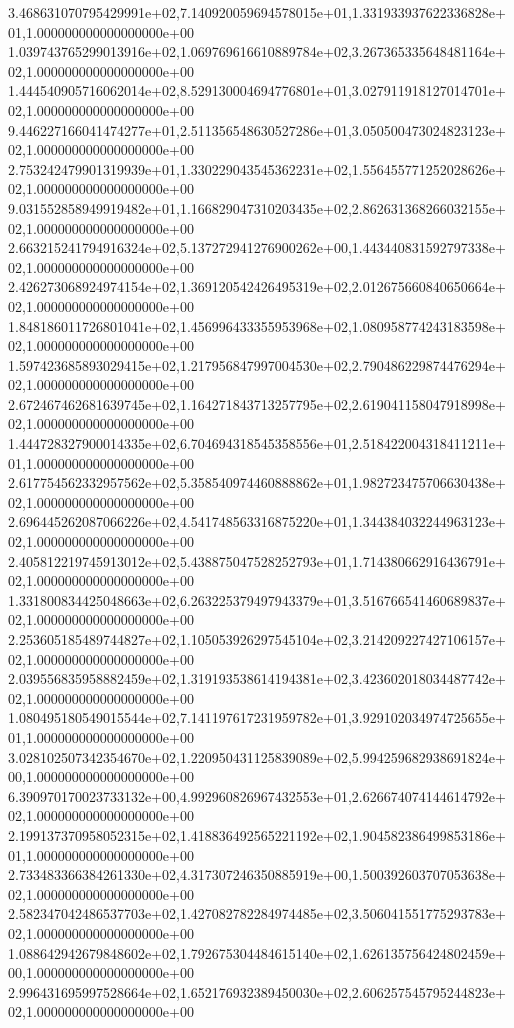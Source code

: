 3.468631070795429991e+02,7.140920059694578015e+01,1.331933937622336828e+01,1.000000000000000000e+00
1.039743765299013916e+02,1.069769616610889784e+02,3.267365335648481164e+02,1.000000000000000000e+00
1.444540905716062014e+02,8.529130004694776801e+01,3.027911918127014701e+02,1.000000000000000000e+00
9.446227166041474277e+01,2.511356548630527286e+01,3.050500473024823123e+02,1.000000000000000000e+00
2.753242479901319939e+01,1.330229043545362231e+02,1.556455771252028626e+02,1.000000000000000000e+00
9.031552858949919482e+01,1.166829047310203435e+02,2.862631368266032155e+02,1.000000000000000000e+00
2.663215241794916324e+02,5.137272941276900262e+00,1.443440831592797338e+02,1.000000000000000000e+00
2.426273068924974154e+02,1.369120542426495319e+02,2.012675660840650664e+02,1.000000000000000000e+00
1.848186011726801041e+02,1.456996433355953968e+02,1.080958774243183598e+02,1.000000000000000000e+00
1.597423685893029415e+02,1.217956847997004530e+02,2.790486229874476294e+02,1.000000000000000000e+00
2.672467462681639745e+02,1.164271843713257795e+02,2.619041158047918998e+02,1.000000000000000000e+00
1.444728327900014335e+02,6.704694318545358556e+01,2.518422004318411211e+01,1.000000000000000000e+00
2.617754562332957562e+02,5.358540974460888862e+01,1.982723475706630438e+02,1.000000000000000000e+00
2.696445262087066226e+02,4.541748563316875220e+01,1.344384032244963123e+02,1.000000000000000000e+00
2.405812219745913012e+02,5.438875047528252793e+01,1.714380662916436791e+02,1.000000000000000000e+00
1.331800834425048663e+02,6.263225379497943379e+01,3.516766541460689837e+02,1.000000000000000000e+00
2.253605185489744827e+02,1.105053926297545104e+02,3.214209227427106157e+02,1.000000000000000000e+00
2.039556835958882459e+02,1.319193538614194381e+02,3.423602018034487742e+02,1.000000000000000000e+00
1.080495180549015544e+02,7.141197617231959782e+01,3.929102034974725655e+01,1.000000000000000000e+00
3.028102507342354670e+02,1.220950431125839089e+02,5.994259682938691824e+00,1.000000000000000000e+00
6.390970170023733132e+00,4.992960826967432553e+01,2.626674074144614792e+02,1.000000000000000000e+00
2.199137370958052315e+02,1.418836492565221192e+02,1.904582386499853186e+01,1.000000000000000000e+00
2.733483366384261330e+02,4.317307246350885919e+00,1.500392603707053638e+02,1.000000000000000000e+00
2.582347042486537703e+02,1.427082782284974485e+02,3.506041551775293783e+02,1.000000000000000000e+00
1.088642942679848602e+02,1.792675304484615140e+02,1.626135756424802459e+00,1.000000000000000000e+00
2.996431695997528664e+02,1.652176932389450030e+02,2.606257545795244823e+02,1.000000000000000000e+00
